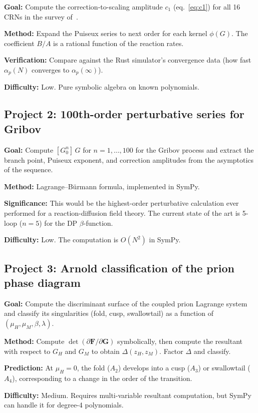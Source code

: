\documentclass[11pt,a4paper]{article}
\theoremstyle{definition}
\begin{document}
\textbf{Goal:} Compute the correction-to-scaling amplitude $c_1$
(eq.~\ref{eq:c1}) for all 16 CRNs in the survey of~\cite{amarteifio2026rdft}.

\textbf{Method:} Expand the Puiseux series to next order for each kernel
$\phi(G)$. The coefficient $B/A$ is a rational function of the reaction rates.

\textbf{Verification:} Compare against the Rust simulator's convergence
data (how fast $\alpha_p(N)$ converges to $\alpha_p(\infty)$).

\textbf{Difficulty:} Low. Pure symbolic algebra on known polynomials.

\subsection{Project 2: 100th-order perturbative series for Gribov}

\textbf{Goal:} Compute $[G_0^n]\,G$ for $n = 1, \ldots, 100$ for the
Gribov process and extract the branch point, Puiseux exponent, and
correction amplitudes from the asymptotics of the sequence.

\textbf{Method:} Lagrange--B\"urmann formula, implemented in SymPy.

\textbf{Significance:} This would be the highest-order perturbative
calculation ever performed for a reaction-diffusion field theory.
The current state of the art is 5-loop ($n = 5$) for the DP
$\beta$-function.

\textbf{Difficulty:} Low. The computation is $O(N^2)$ in SymPy.

\subsection{Project 3: Arnold classification of the prion phase diagram}

\textbf{Goal:} Compute the discriminant surface of the coupled prion
Lagrange system and classify its singularities (fold, cusp, swallowtail)
as a function of $(\mu_H, \mu_M, \beta, \lambda)$.

\textbf{Method:} Compute $\det(\partial \mathbf{F}/\partial \mathbf{G})$
symbolically, then compute the resultant with respect to $G_H$ and $G_M$
to obtain $\Delta(z_H, z_M)$. Factor $\Delta$ and classify.

\textbf{Prediction:} At $\mu_H = 0$, the fold ($A_2$) develops into a
cusp ($A_3$) or swallowtail ($A_4$), corresponding to a change in the
order of the transition.

\textbf{Difficulty:} Medium. Requires multi-variable resultant computation,
but SymPy can handle it for degree-4 polynomials.
\end{document}
